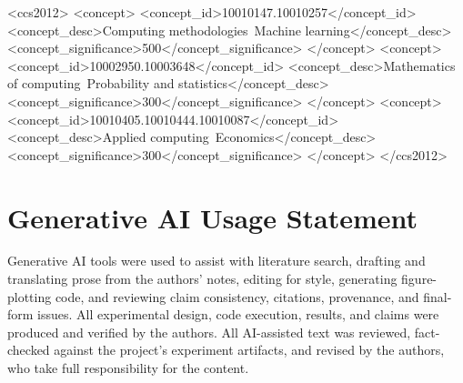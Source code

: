 \documentclass[sigconf,review,anonymous]{acmart}
\begin{document}
\begin{CCSXML}
<ccs2012>
   <concept>
       <concept_id>10010147.10010257</concept_id>
       <concept_desc>Computing methodologies~Machine learning</concept_desc>
       <concept_significance>500</concept_significance>
   </concept>
   <concept>
       <concept_id>10002950.10003648</concept_id>
       <concept_desc>Mathematics of computing~Probability and statistics</concept_desc>
       <concept_significance>300</concept_significance>
   </concept>
   <concept>
       <concept_id>10010405.10010444.10010087</concept_id>
       <concept_desc>Applied computing~Economics</concept_desc>
       <concept_significance>300</concept_significance>
   </concept>
</ccs2012>
\end{CCSXML}

\maketitle











\section*{Generative AI Usage Statement}
Generative AI tools were used to assist with literature search, drafting
and translating prose from the authors' notes, editing for style, generating
figure-plotting code, and reviewing claim consistency, citations, provenance,
and final-form issues. All experimental design, code execution, results, and
claims were produced and verified by the authors. All
AI-assisted text was reviewed, fact-checked against the project's
experiment artifacts, and revised by the authors, who take full
responsibility for the content.




\end{document}
